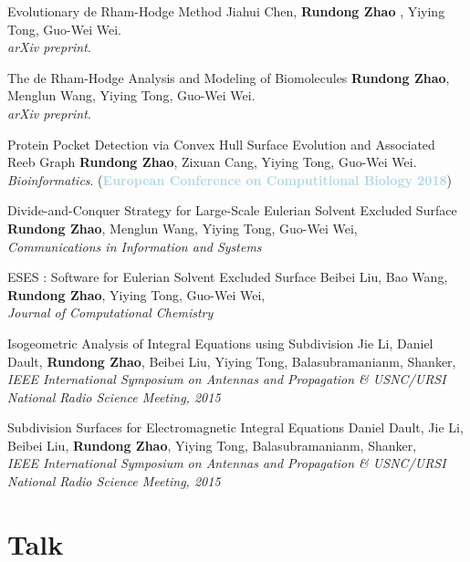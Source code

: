 \documentclass[11pt,a4paper,sans]{moderncv}
\begin{document}
	{ Evolutionary de Rham-Hodge Method}{}{}{}
	{\textnormal{Jiahui Chen, } \textbf{Rundong Zhao} \textnormal{, Yiying Tong, Guo-Wei Wei}. \\
	\textit{arXiv preprint}.}{}

	{ The de Rham-Hodge Analysis and Modeling of Biomolecules}{}{}{}
	{\textbf{Rundong Zhao}\textnormal{, Menglun Wang, Yiying Tong, Guo-Wei Wei}. \\
	\textit{arXiv preprint}.}{}
	
	{ Protein Pocket Detection via Convex Hull Surface Evolution and Associated Reeb Graph}{}{}{}
	{\textbf{Rundong Zhao}\textnormal{, Zixuan Cang, Yiying Tong, Guo-Wei Wei}. \\
	\textit{Bioinformatics}. (\textbf{\textcolor{lightblue}{European Conference on Computitional Biology 2018}})}{}
	
	{ Divide-and-Conquer Strategy for Large-Scale Eulerian Solvent Excluded Surface}{}{}{}
	{\textbf{Rundong Zhao}\textnormal{, Menglun Wang, Yiying Tong, Guo-Wei Wei}, \\
	\textit{Communications in Information and Systems}}{}
	
	{ ESES : Software for Eulerian Solvent Excluded Surface}{}{}{}
	{\textnormal{Beibei Liu, Bao Wang, }\textbf{Rundong Zhao}\textnormal{, Yiying Tong, Guo-Wei Wei}, \\ 
	\textit{Journal of Computational Chemistry}}{}
	
	{ Isogeometric Analysis of Integral Equations using Subdivision}{}{}{}
	{\textnormal{Jie Li, Daniel Dault, }\textbf{Rundong Zhao}\textnormal{, Beibei Liu, Yiying Tong, Balasubramanianm, Shanker}, \\
	\textit{IEEE International Symposium on Antennas and Propagation \& USNC/URSI National Radio Science Meeting, 2015}}{}
	
	{ Subdivision Surfaces for Electromagnetic Integral Equations}{}{}{}
	{\textnormal{Daniel Dault, Jie Li, Beibei Liu, }\textbf{Rundong Zhao}\textnormal{, Yiying Tong, Balasubramanianm, Shanker}, \\
	\textit{IEEE International Symposium on Antennas and Propagation \& USNC/URSI National Radio Science Meeting, 2015}}{}
	
	\section{Talk}
	
\end{document}
